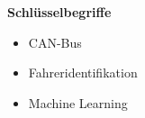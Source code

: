 %
%
%
%
%


{\Large\bfseries Schlüsselbegriffe}
\vspace{0.65cm}

\begin{itemize}
	\setlength{\itemsep}{0pt}
	\item[] CAN-Bus
	\item[] Fahreridentifikation
	\item[] Machine Learning
\end{itemize}
